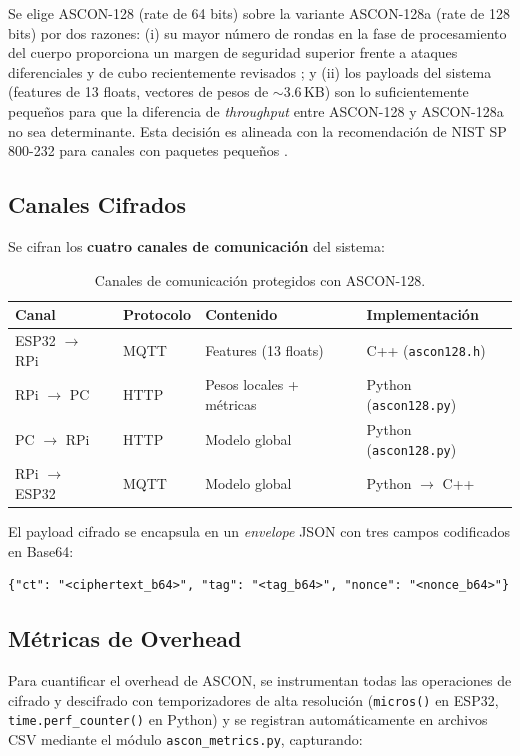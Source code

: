 Se elige ASCON-128 (rate de 64 bits) sobre la variante ASCON-128a (rate de 128 bits) por dos razones: (i) su mayor número de rondas en la fase de procesamiento del cuerpo proporciona un margen de seguridad superior frente a ataques diferenciales y de cubo recientemente revisados \cite{Kaur2025_ASCON_Survey}; y (ii) los payloads del sistema (features de 13 floats, vectores de pesos de $\sim$3.6\,KB) son lo suficientemente pequeños para que la diferencia de \emph{throughput} entre ASCON-128 y ASCON-128a no sea determinante. Esta decisión es alineada con la recomendación de NIST SP 800-232 para canales con paquetes pequeños \cite{NISTSP8002322025}.

\subsection{Canales Cifrados}

Se cifran los \textbf{cuatro canales de comunicación} del sistema:

\begin{table}[H]
\centering
\caption{Canales de comunicación protegidos con ASCON-128.}
\label{tab:canales_ascon}
\begin{tabular}{l l l l}
\toprule
\textbf{Canal} & \textbf{Protocolo} & \textbf{Contenido} & \textbf{Implementación} \\
\midrule
ESP32 $\to$ RPi & MQTT & Features (13 floats)    & C++ (\texttt{ascon128.h}) \\
RPi $\to$ PC    & HTTP & Pesos locales + métricas & Python (\texttt{ascon128.py}) \\
PC $\to$ RPi    & HTTP & Modelo global            & Python (\texttt{ascon128.py}) \\
RPi $\to$ ESP32 & MQTT & Modelo global            & Python $\to$ C++ \\
\bottomrule
\end{tabular}
\end{table}

El payload cifrado se encapsula en un \emph{envelope} JSON con tres campos codificados en Base64:
\begin{verbatim}
{"ct": "<ciphertext_b64>", "tag": "<tag_b64>", "nonce": "<nonce_b64>"}
\end{verbatim}

\subsection{Métricas de Overhead}

Para cuantificar el overhead de ASCON, se instrumentan todas las operaciones de cifrado y descifrado con temporizadores de alta resolución (\texttt{micros()} en ESP32, \texttt{time.perf\_counter()} en Python) y se registran automáticamente en archivos CSV mediante el módulo \texttt{ascon\_metrics.py}, capturando:


